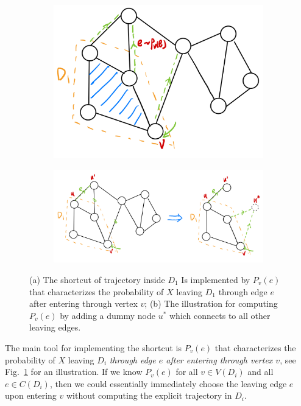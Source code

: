 \begin{figure}[t!]
        \centering
        \begin{subfigure}[b]{.35\textwidth}
            \includegraphics[width=0.9\linewidth, trim={1cm 1cm 1cm 0},clip]{figs/shortcut_impl.jpeg}
            \caption{}
            \label{fig:shortcut_impl}
        \end{subfigure}
        \begin{subfigure}[b]{.62\textwidth}
            \includegraphics[width=0.95\linewidth, trim={1cm 1cm 1cm 0},clip]{figs/compute_prob.jpeg}
            \caption{}
            \label{fig:compute_prob}
        \end{subfigure}
        \caption{(a) The shortcut of trajectory inside $D_1$ Is implemented by $P_v(e)$ that characterizes the probability of $X$ leaving $D_1$ through edge $e$ after entering through vertex $v$; (b) The illustration for computing $P_v(e)$ by adding a dummy node $u^*$ which connects to all other leaving edges.}
\end{figure}

The main tool for implementing the shortcut is $P_v(e)$ that characterizes the probability of $X$ leaving $D_i$ \emph{through edge $e$ after entering through vertex $v$}, see Fig.\ \ref{fig:shortcut_impl} for an illustration.
If we know $P_v(e)$ for all $v \in V(D_i)$ and all $e \in C(D_i)$, then we could essentially immediately choose the leaving edge $e$ upon entering $v$ without computing the explicit trajectory in $D_i$.


